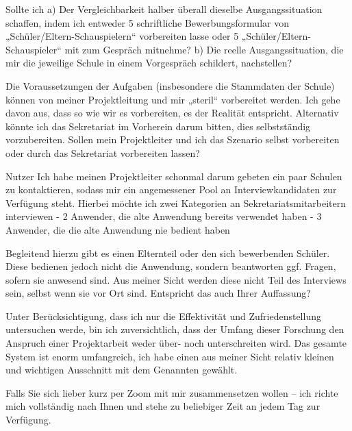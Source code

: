 Sollte ich 
a)	Der Vergleichbarkeit halber überall dieselbe Ausgangssituation schaffen, indem ich entweder 5 schriftliche Bewerbungsformular von „Schüler/Eltern-Schauspielern“ vorbereiten lasse oder 5 „Schüler/Eltern-Schauspieler“ mit zum Gespräch mitnehme?
b)	Die reelle Ausgangssituation, die mir die jeweilige Schule in einem Vorgespräch schildert, nachstellen?

Die Voraussetzungen der Aufgaben (insbesondere die Stammdaten der Schule) können von meiner Projektleitung und mir „steril“ vorbereitet werden.
Ich gehe davon aus, dass so wie wir es vorbereiten, es der Realität entspricht. Alternativ könnte ich das Sekretariat im Vorherein darum bitten, dies selbstständig vorzubereiten.
Sollen mein Projektleiter und ich das Szenario selbst vorbereiten oder durch das Sekretariat vorbereiten lassen?

Nutzer
Ich habe meinen Projektleiter schonmal darum gebeten ein paar Schulen zu kontaktieren, sodass mir ein angemessener Pool an Interviewkandidaten zur Verfügung steht.
Hierbei möchte ich zwei Kategorien an Sekretariatsmitarbeitern interviewen
-	2 Anwender, die alte Anwendung bereits verwendet haben 
-	3 Anwender, die die alte Anwendung nie bedient haben 

Begleitend hierzu gibt es einen Elternteil oder den sich bewerbenden Schüler. Diese bedienen jedoch nicht die Anwendung, sondern beantworten ggf. Fragen, sofern sie anwesend sind.
Aus meiner Sicht werden diese nicht Teil des Interviews sein, selbst wenn sie vor Ort sind. Entspricht das auch Ihrer Auffassung?

Unter Berücksichtigung, dass ich nur die Effektivität und Zufriedenstellung untersuchen werde, bin ich zuversichtlich, dass der Umfang dieser Forschung den Anspruch einer Projektarbeit weder über- noch unterschreiten wird.
Das gesamte System ist enorm umfangreich, ich habe einen aus meiner Sicht relativ kleinen und wichtigen Ausschnitt mit dem Genannten gewählt.

Falls Sie sich lieber kurz per Zoom mit mir zusammensetzen wollen – ich richte mich vollständig nach Ihnen und stehe zu beliebiger Zeit an jedem Tag zur Verfügung.

